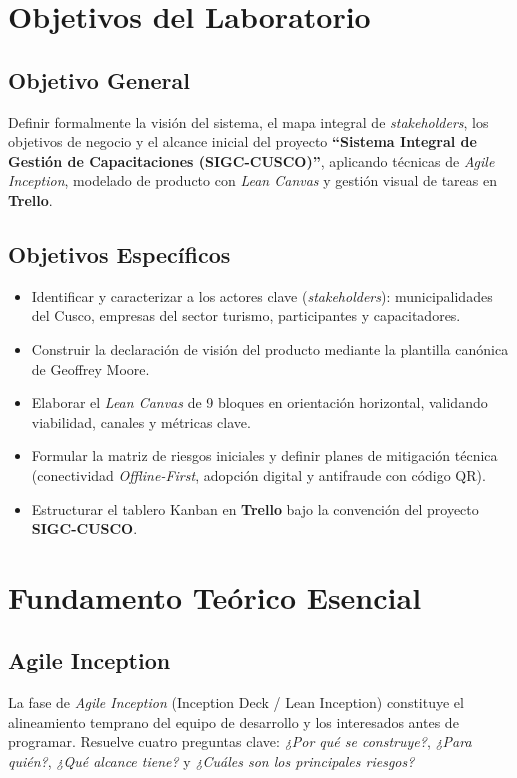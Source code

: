 
\section{Objetivos del Laboratorio}

\subsection{Objetivo General}
Definir formalmente la visión del sistema, el mapa integral de \textit{stakeholders}, los objetivos de negocio y el alcance inicial del proyecto \textbf{“Sistema Integral de Gestión de Capacitaciones (SIGC-CUSCO)”}, aplicando técnicas de \textit{Agile Inception}, modelado de producto con \textit{Lean Canvas} y gestión visual de tareas en \textbf{Trello}.

\subsection{Objetivos Específicos}
\begin{itemize}
    \item Identificar y caracterizar a los actores clave (\textit{stakeholders}): municipalidades del Cusco, empresas del sector turismo, participantes y capacitadores.
    \item Construir la declaración de visión del producto mediante la plantilla canónica de Geoffrey Moore.
    \item Elaborar el \textit{Lean Canvas} de 9 bloques en orientación horizontal, validando viabilidad, canales y métricas clave.
    \item Formular la matriz de riesgos iniciales y definir planes de mitigación técnica (conectividad \textit{Offline-First}, adopción digital y antifraude con código QR).
    \item Estructurar el tablero Kanban en \textbf{Trello} bajo la convención del proyecto \textbf{SIGC-CUSCO}.
\end{itemize}

\section{Fundamento Teórico Esencial}

\subsection{Agile Inception}
La fase de \textit{Agile Inception} (Inception Deck / Lean Inception) constituye el alineamiento temprano del equipo de desarrollo y los interesados antes de programar. Resuelve cuatro preguntas clave: \textit{¿Por qué se construye?}, \textit{¿Para quién?}, \textit{¿Qué alcance tiene?} y \textit{¿Cuáles son los principales riesgos?}

